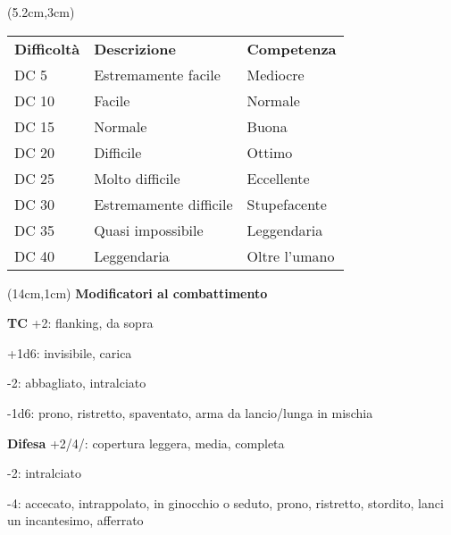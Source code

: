 \documentclass[a4paper,12 pt,openany]{book}
\begin{document}
\begin{textblock*}{8.5cm}(5.2cm,3cm) %
	\footnotesize
	\begin{tabular}{lll}
\textbf{Difficoltà} & \textbf{Descrizione} & \textbf{Competenza} \\
DC 5           & Estremamente facile              & Mediocre                        \\
DC 10          & Facile                           & Normale                         \\
DC 15          & Normale                          & Buona                           \\
DC 20          & Difficile                        & Ottimo                          \\
DC 25          & Molto difficile                  & Eccellente                      \\
DC 30          & Estremamente difficile           & Stupefacente                    \\
DC 35          & Quasi impossibile                & Leggendaria                     \\
DC 40          & Leggendaria                      & Oltre l'umano                   \\
		\end{tabular}
	\end{textblock*}



\begin{textblock*}{6cm}(14cm,1cm) %
\textbf{Modificatori al combattimento}

{\footnotesize \textbf{TC} +2: flanking, da sopra

+1d6: invisibile, carica

-2: abbagliato, intralciato

-1d6: prono, ristretto, spaventato, arma da lancio/lunga in mischia

\textbf{Difesa} +2/4/: copertura leggera, media, completa

-2: intralciato

-4: accecato, intrappolato, in ginocchio o seduto, prono, ristretto, stordito, lanci un incantesimo, afferrato}
\end{textblock*}
\end{document}

